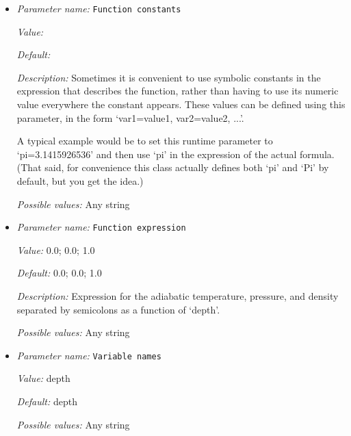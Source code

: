 \begin{itemize}
\item {\it Parameter name:} {\tt Function constants}
\label{parameters:Adiabatic conditions model/Function/Function constants}
\label{parameters:Adiabatic_20conditions_20model/Function/Function_20constants}


{\it Value:} 


{\it Default:} 


{\it Description:} Sometimes it is convenient to use symbolic constants in the expression that describes the function, rather than having to use its numeric value everywhere the constant appears. These values can be defined using this parameter, in the form `var1=value1, var2=value2, ...'.

A typical example would be to set this runtime parameter to `pi=3.1415926536' and then use `pi' in the expression of the actual formula. (That said, for convenience this class actually defines both `pi' and `Pi' by default, but you get the idea.)


{\it Possible values:} Any string
\item {\it Parameter name:} {\tt Function expression}
\label{parameters:Adiabatic conditions model/Function/Function expression}
\label{parameters:Adiabatic_20conditions_20model/Function/Function_20expression}


{\it Value:} 0.0; 0.0; 1.0


{\it Default:} 0.0; 0.0; 1.0


{\it Description:} Expression for the adiabatic temperature, pressure, and density separated by semicolons as a function of `depth'.


{\it Possible values:} Any string
\item {\it Parameter name:} {\tt Variable names}
\label{parameters:Adiabatic conditions model/Function/Variable names}
\label{parameters:Adiabatic_20conditions_20model/Function/Variable_20names}


{\it Value:} depth


{\it Default:} depth


{\it Possible values:} Any string
\end{itemize}

